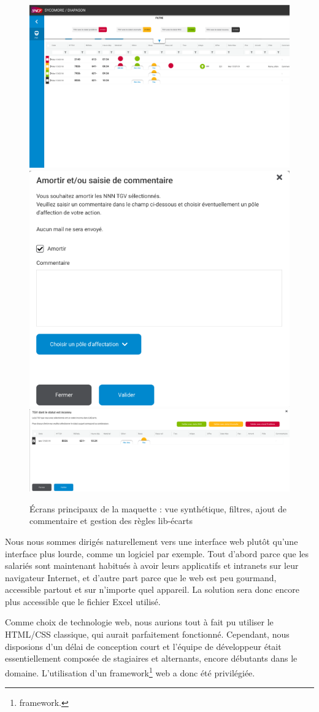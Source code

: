   \begin{figure}[H]
    \centering
    \includegraphics[width=0.58\linewidth]{img/maquette_home_page_filters.png}
    \includegraphics[width=0.40\linewidth]{img/maquette_commentaire.png}
    \includegraphics[width=1\linewidth]{img/maquette_create_libecart.png}
    \caption{Écrans principaux de la maquette : vue synthétique, filtres, ajout de commentaire et gestion des règles lib-écarts}
  \end{figure}

Nous nous sommes dirigés naturellement vers une interface web plutôt qu'une interface plus lourde, comme un logiciel par exemple. Tout d'abord parce que les salariés sont maintenant habitués à avoir leurs applicatifs et intranets sur leur navigateur Internet, et d'autre part parce que le web est peu gourmand, accessible partout et sur n'importe quel appareil. La solution sera donc encore plus accessible que le fichier Excel utilisé.

Comme choix de technologie web, nous aurions tout à fait pu utiliser le HTML/CSS classique, qui aurait parfaitement fonctionné. Cependant, nous disposions d'un délai de conception court et l'équipe de développeur était essentiellement composée de stagiaires et alternants, encore débutants dans le domaine. L'utilisation d'un 
\gls{framework}\footnote{\glsdesc{framework}.}
web a donc été privilégiée.

